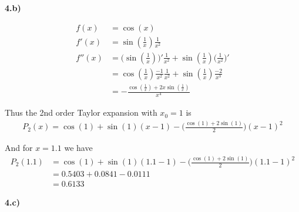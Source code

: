 \textbf{4.b)}

\begin{align*}
f(x) &= \cos(x) \\
f'(x) &= \sin(\frac{1}{x}) \frac{1}{x^2}\\
f''(x) &= \Big( \sin(\frac{1}{x}) \Big)' \frac{1}{x^2} + \sin(\frac{1}{x}) \Big( \frac{1}{x^2}\Big)'\\
&= \cos(\frac{1}{x})\frac{-1}{x^2}\frac{1}{x^2} + \sin(\frac{1}{x}) \frac{-2}{x^3}\\
&= -\frac{\cos(\frac{1}{x}) + 2x\sin(\frac{1}{x})}{x^4}
\end{align*}

Thus the 2nd order Taylor expansion with $x_0 = 1$ is
\begin{align*}
P_2(x) = \cos(1) + \sin(1)(x-1) - \Big( \frac{\cos(1)+2\sin(1)}{2} \Big)(x - 1)^2
\end{align*}

And for $x = 1.1$ we have
\begin{align*}
P_2(1.1) &= \cos(1) + \sin(1)(1.1-1) - \Big( \frac{\cos(1)+2\sin(1)}{2} \Big)(1.1 - 1)^2\\
&= 0.5403 + 0.0841 - 0.0111\\
&= 0.6133
\end{align*}

\textbf{4.c)}

























